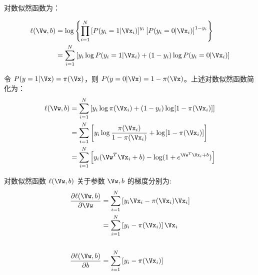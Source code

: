 对数似然函数为：

\begin{align}
	\ell(\Vw, b) &= \log\left\{\prod_{i = 1}^N \left[P(y_i = 1 | \Vx_i)\right]^{y_i} \left[P(y_i = 0 | \Vx_i)\right]^{1 - y_i} \right\} \nonumber \\
	             &= \sum\limits_{i=1}^N\left[y_i\log P(y_i = 1 | \Vx_i)+(1-y_i)\log P(y_i = 0 | \Vx_i)\right] \nonumber 
\end{align}

令 $ P(y=1|\Vx) = \pi(\Vx) $，则 $ P(y=0|\Vx) = 1 - \pi(\Vx) $。上述对数似然函数简化为：
\begin{align}
	\ell(\Vw, b) &= \sum\limits_{i=1}^N \left[
					y_i\log \pi(\Vx_i) + (1-y_i)\log[1-\pi(\Vx_i)]
					\right] \nonumber \\
	             &= \sum\limits_{i=1}^N \left[
	             	y_i \log \frac{\pi(\Vx_i)}{1-\pi(\Vx_i)} + \log[1-\pi(\Vx_i)]
	             	\right] \nonumber \\
	             &= \sum\limits_{i=1}^N \left[
	             	y_i (\Vw^T\Vx_i+b) - \log (1 + e^{\Vw^T\Vx_i+b})
	             	\right]
\end{align}


对数似然函数 $ \ell(\Vw, b) $ 关于参数 $ \Vw, b $ 的梯度分别为:
\begin{align}
	\frac{\partial \ell(\Vw, b)}{\partial \Vw} &= \sum \limits_{i=1}^N \left[
		                                          y_i \Vx_i - \pi(\Vx_i) \Vx_i
		                                          \right]  \nonumber \\
		                                       &= \sum \limits_{i=1}^N \left[
		                                          y_i - \pi(\Vx_i) \right] \Vx_i \\ \nonumber \\
	\frac{\partial \ell(\Vw, b)}{\partial b} &= \sum \limits_{i=1}^N \left[
		                                          y_i - \pi(\Vx_i)
		                                          \right]
\end{align}












